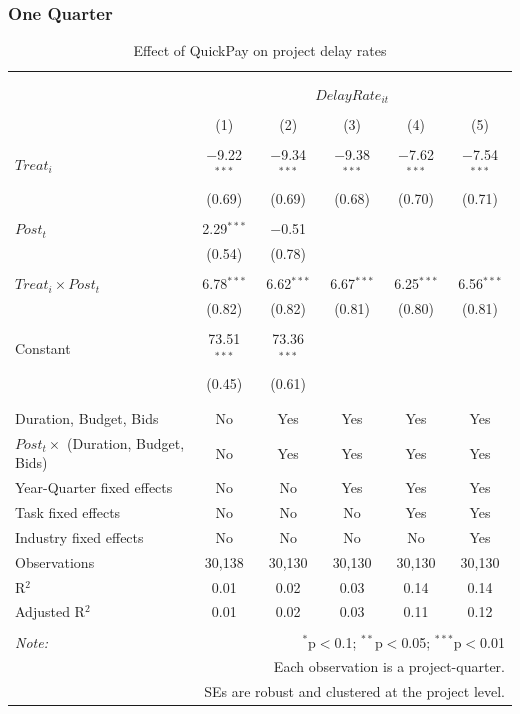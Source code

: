 \documentclass[
]{article}
\begin{document}
\hypertarget{one-quarter-3}{%
\subsubsection{One Quarter}\label{one-quarter-3}}

\begin{table}[H] \centering 
  \caption{Effect of QuickPay on project delay rates} 
  \label{} 
\small 
\begin{tabular}{@{\extracolsep{-2pt}}lccccc} 
\\[-1.8ex]\hline 
\hline \\[-1.8ex] 
\\[-1.8ex] & \multicolumn{5}{c}{$DelayRate_{it}$} \\ 
\\[-1.8ex] & (1) & (2) & (3) & (4) & (5)\\ 
\hline \\[-1.8ex] 
 $Treat_i$ & $-$9.22$^{***}$ & $-$9.34$^{***}$ & $-$9.38$^{***}$ & $-$7.62$^{***}$ & $-$7.54$^{***}$ \\ 
  & (0.69) & (0.69) & (0.68) & (0.70) & (0.71) \\ 
  & & & & & \\ 
 $Post_t$ & 2.29$^{***}$ & $-$0.51 &  &  &  \\ 
  & (0.54) & (0.78) &  &  &  \\ 
  & & & & & \\ 
 $Treat_i \times Post_t$ & 6.78$^{***}$ & 6.62$^{***}$ & 6.67$^{***}$ & 6.25$^{***}$ & 6.56$^{***}$ \\ 
  & (0.82) & (0.82) & (0.81) & (0.80) & (0.81) \\ 
  & & & & & \\ 
 Constant & 73.51$^{***}$ & 73.36$^{***}$ &  &  &  \\ 
  & (0.45) & (0.61) &  &  &  \\ 
  & & & & & \\ 
\hline \\[-1.8ex] 
Duration, Budget, Bids & No & Yes & Yes & Yes & Yes \\ 
$Post_t \times$  (Duration, Budget, Bids) & No & Yes & Yes & Yes & Yes \\ 
Year-Quarter fixed effects & No & No & Yes & Yes & Yes \\ 
Task fixed effects & No & No & No & Yes & Yes \\ 
Industry fixed effects & No & No & No & No & Yes \\ 
Observations & 30,138 & 30,130 & 30,130 & 30,130 & 30,130 \\ 
R$^{2}$ & 0.01 & 0.02 & 0.03 & 0.14 & 0.14 \\ 
Adjusted R$^{2}$ & 0.01 & 0.02 & 0.03 & 0.11 & 0.12 \\ 
\hline 
\hline \\[-1.8ex] 
\textit{Note:}  & \multicolumn{5}{r}{$^{*}$p$<$0.1; $^{**}$p$<$0.05; $^{***}$p$<$0.01} \\ 
 & \multicolumn{5}{r}{Each observation is a project-quarter.} \\ 
 & \multicolumn{5}{r}{SEs are robust and clustered at the project level.} \\ 
\end{tabular} 
\end{table}
\end{document}
